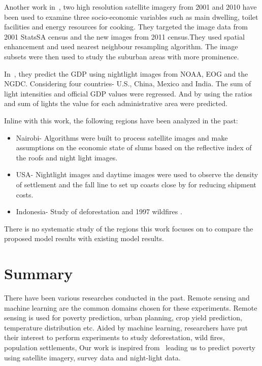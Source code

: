 Another work in~\cite{munyati2014inferring}, two high resolution satellite imagery from 2001 and 2010 have been used to examine three socio-economic variables such as main dwelling, toilet facilities and energy resources for cooking. They targeted the image data from 2001 StatsSA census and the new images from 2011 census.They used spatial enhancement and used nearest neighbour resampling algorithm. The image subsets were then used to study the suburban areas with more prominence.

In~\cite{ghosh2013using}, they predict the \ac{GDP} using nightlight images from \ac{NOAA}, \ac{EOG} and the \ac{NGDC}. Considering four countries- U.S., China, Mexico and India. The sum of light intensities and official \ac{GDP} values were regressed. And by using the ratios and sum of lights the value for each  administrative area were predicted.


Inline with this work, the following regions have been analyzed in the past:
\begin{itemize}

\item Nairobi- Algorithms were built to process satellite images and make assumptions on the economic state of slums based on the reflective index of the roofs and night light images\cite{zhao2016spectral}.
\item USA- Nightlight images and daytime images were used to observe the density of settlement and the fall line to set up coasts close by for reducing shipment costs.
\item Indonesia- Study of deforestation and 1997 wildfires \cite{xie2016transfer}. 

\end{itemize}

There is no systematic study of the regions this work focuses on to compare the proposed model results with existing model results.

\section{Summary}
There have been various researches conducted in the past. Remote sensing and machine learning are the common domains chosen for these experiments. Remote sensing is used for poverty prediction, urban planning, crop yield prediction, temperature distribution etc. Aided by machine learning, researchers have put their interest to perform experiments to study deforestation, wild fires, population settlements,   Our work is inspired from~\cite{jean2016combining} leading us to predict poverty using satellite imagery, survey data and night-light data. 